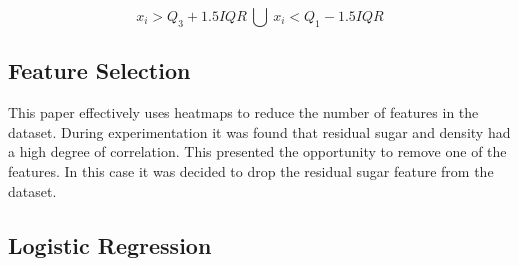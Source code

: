 \begin{equation}
x_{i} > Q_{3}+1.5IQR\ \bigcup \ x_{i} < Q_{1}-1.5IQR
\end{equation}

\subsection{Feature Selection}

This paper effectively uses heatmaps to reduce the number of features in the dataset. During experimentation it was found that residual sugar and density had a high degree of correlation. This presented the opportunity to remove one of the features. In this case it was decided to drop the residual sugar feature from the dataset.

\subsection{Logistic Regression}

